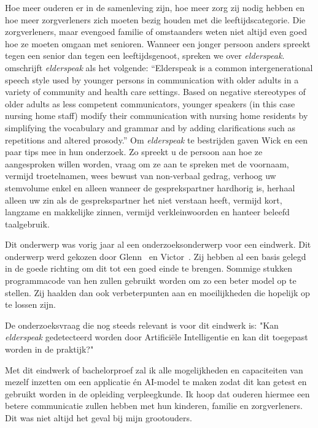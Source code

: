 Hoe meer ouderen er in de samenleving zijn, hoe meer zorg zij nodig hebben en hoe meer zorgverleners zich moeten bezig houden met die leeftijdscategorie.
Die zorgverleners, maar evengoed familie of omstaanders weten niet altijd even goed hoe ze moeten omgaan met senioren.
Wanneer een jonger persoon anders spreekt tegen een senior dan tegen een leeftijdsgenoot, spreken we over \textit{elderspeak}. \textcite{Williams2011} omschrijft \textit{elderspeak} als het volgende: \enquote{Elderspeak is a common intergenerational speech style used by younger persons in communication with older adults in a variety of community and health care settings. Based on negative stereotypes of older adults as less competent communicators, younger speakers (in this case nursing home staff) modify their communication with nursing home residents by simplifying the vocabulary and grammar and by adding clarifications such as repetitions and altered prosody.} Om \textit{elderspeak} te bestrijden gaven Wick en \textcite{Wick2007} een paar tips mee in hun onderzoek.
Zo spreekt u de persoon aan hoe ze aangesproken willen worden, vraag om ze aan te spreken met de voornaam, vermijd troetelnamen, wees bewust van non-verbaal gedrag, verhoog uw stemvolume enkel en alleen wanneer de gesprekspartner hardhorig is, herhaal alleen uw zin als de gesprekspartner het niet verstaan heeft, vermijd kort, langzame en makkelijke zinnen, vermijd verkleinwoorden en hanteer beleefd taalgebruik.

Dit onderwerp was vorig jaar al een onderzoeksonderwerp voor een eindwerk.
Dit onderwerp werd gekozen door Glenn~\textcite{Beeckman2021} en Victor~\textcite{Standaert2021}.
Zij hebben al een basis gelegd in de goede richting om dit tot een goed einde te brengen.
Sommige stukken programmacode van hen zullen gebruikt worden om zo een beter model op te stellen.
Zij haalden dan ook verbeterpunten aan en moeilijkheden die hopelijk op te lossen zijn.

De onderzoeksvraag die nog steeds relevant is voor dit eindwerk is: "Kan \textit{elderspeak} gedetecteerd worden door Artificiële Intelligentie en kan dit toegepast worden in de praktijk?"

Met dit eindwerk of bachelorproef zal ik alle mogelijkheden en capaciteiten van mezelf inzetten om een applicatie én AI-model te maken zodat dit kan getest en gebruikt worden in de opleiding verpleegkunde.
Ik hoop dat ouderen hiermee een betere communicatie zullen hebben met hun kinderen, familie en zorgverleners.
Dit was niet altijd het geval bij mijn grootouders.

